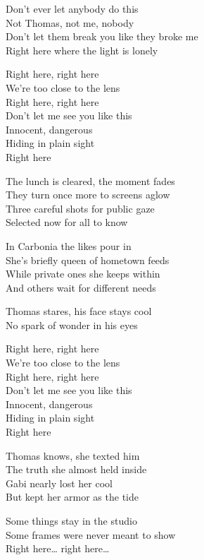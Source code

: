 \begin{lyrics}
Don’t ever let anybody do this\\
Not Thomas, not me, nobody\\
Don’t let them break you like they broke me\\
Right here where the light is lonely

Right here, right here\\
We’re too close to the lens\\
Right here, right here\\
Don’t let me see you like this\\
Innocent, dangerous\\
Hiding in plain sight\\
Right here

The lunch is cleared, the moment fades\\
They turn once more to screens aglow\\
Three careful shots for public gaze\\
Selected now for all to know

In Carbonia the likes pour in\\
She’s briefly queen of hometown feeds\\
While private ones she keeps within\\
And others wait for different needs

Thomas stares, his face stays cool\\
No spark of wonder in his eyes

Right here, right here\\
We’re too close to the lens\\
Right here, right here\\
Don’t let me see you like this\\
Innocent, dangerous\\
Hiding in plain sight\\
Right here

Thomas knows, she texted him\\
The truth she almost held inside\\
Gabi nearly lost her cool\\
But kept her armor as the tide

Some things stay in the studio\\
Some frames were never meant to show\\
Right here… right here…
\end{lyrics}


